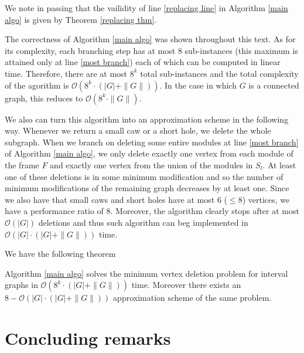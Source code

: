 \documentclass{article}
\begin{document}
    We note in passing that the vailidity of
    line \ref{replacing line} in
    Algorithm \ref{main algo}
    is given by Theorem \ref{replacing thm}.
    
    The correctness of Algorithm \ref{main algo}
    was shown throughout this text.
    As for its complexity, each
    branching step has at most
    $8$ sub-instances (this
    maximum is attained only
    at line \ref{most branch}) each
    of which can be computed
    in linear time. Therefore,
    there are at most $8^{k}$ 
    total sub-instances and 
    the total complexity of the agorithm
    is $\mathcal{O} \left(8^{k} \cdot \left(\left|G\right| + \|G\|\right)\right)$.
    In the case in which $G$ is 
    a connected graph, this reduces to
    $\mathcal{O} \left(8^{k} \cdot \|G\|\right)$.

    We also can turn this
    algorithm into an approximation
    scheme in the following way. 
    Whenever we return a small caw
    or a short hole, we delete the whole
    subgraph. When we branch on deleting
    some entire modules at line \ref{most branch}
    of Algorithm \ref{main algo},
    we only delete exactly one
    vertex from each module of
    the frame $F$ and exactly
    one vertex from the
    union of the modules in $S_{l}$.
    At least one of these
    deletions is in some
    minimum modification and
    so the number of minimum
    modifications of the
    remaining graph decreases
    by at least one.
    Since we also have
    that small caws and short
    holes have at most $6$ ($ \leq 8$)
    vertices, we have
    a performance ratio of $8$.
    Moreover, the algorithm clearly stops
    after at most $\mathcal{O} \left(\left|G\right|\right)$ 
    deletions and thus
    such algorithm can beg
    implemented in $\mathcal{O} \left(\left|G\right| \cdot \left(\left|G\right| + \|G\|\right)\right)$
    time.

    We have the following theorem

    \begin{thm}
        Algorithm \ref{main algo} solves
        the minimum vertex deletion
        problem for interval graphs
        in $\mathcal{O} \left(8^{k} \cdot \left(\left|G\right| + \|G\|\right)\right)$ time.
        Moreover there exists
        an $8-\mathcal{O} \left(\left|G\right| \cdot \left(\left|G\right| + \|G\|\right)\right)$
        approximation scheme of the 
        same problem.
    \end{thm}

    \section{Concluding remarks}
    
\end{document}
